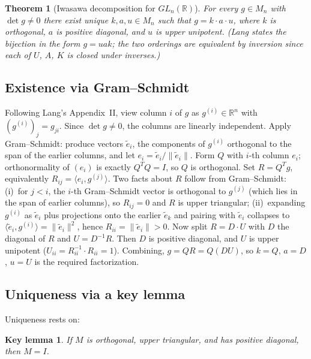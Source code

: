 \documentclass[11pt]{article}
\newtheorem*{theorem*}{Theorem}
\newtheorem*{keylemma*}{Key lemma}
\begin{document}
\begin{theorem*}[Iwasawa decomposition for $GL_n(\mathbb{R})$]
For every $g \in M_n$ with $\det g \neq 0$ there exist unique
$k, a, u \in M_n$ such that $g = k \cdot a \cdot u$, where $k$ is
orthogonal, $a$ is positive diagonal, and $u$ is upper unipotent. (Lang
states the bijection in the form $g = uak$; the two orderings are
equivalent by inversion since each of $U$, $A$, $K$ is closed under
inverses.)
\end{theorem*}

\subsection*{Existence via Gram--Schmidt}

Following Lang's Appendix~II, view column $i$ of $g$ as
$g^{(i)} \in \mathbb{R}^n$ with $(g^{(i)})_j = g_{ji}$. Since
$\det g \neq 0$, the columns are linearly independent. Apply
Gram--Schmidt: produce vectors $\tilde{e}_i$, the components of
$g^{(i)}$ orthogonal to the span of the earlier columns, and let
$e_i = \tilde{e}_i / \|\tilde{e}_i\|$. Form $Q$ with $i$-th column
$e_i$; orthonormality of $(e_i)$ is exactly $Q^T Q = I$, so $Q$ is
orthogonal. Set $R = Q^T g$, equivalently
$R_{ij} = \langle e_i, g^{(j)} \rangle$. Two facts about $R$ follow
from Gram--Schmidt: (i)~for $j < i$, the $i$-th Gram--Schmidt vector
is orthogonal to $g^{(j)}$ (which lies in the span of earlier
columns), so $R_{ij} = 0$ and $R$ is upper triangular;
(ii)~expanding $g^{(i)}$ as $\tilde{e}_i$ plus projections onto the
earlier $\tilde{e}_k$ and pairing with $\tilde{e}_i$ collapses to
$\langle \tilde{e}_i, g^{(i)} \rangle = \|\tilde{e}_i\|^2$, hence
$R_{ii} = \|\tilde{e}_i\| > 0$. Now split $R = D \cdot U$ with $D$
the diagonal of $R$ and $U = D^{-1} R$. Then $D$ is positive
diagonal, and $U$ is upper unipotent
($U_{ii} = R_{ii}^{-1} \cdot R_{ii} = 1$). Combining, $g = QR = Q(DU)$,
so $k = Q$, $a = D$, $u = U$ is the required factorization.

\subsection*{Uniqueness via a key lemma}

Uniqueness rests on:

\begin{keylemma*}
If $M$ is orthogonal, upper triangular, and has positive diagonal, then
$M = I$.
\end{keylemma*}
\end{document}

